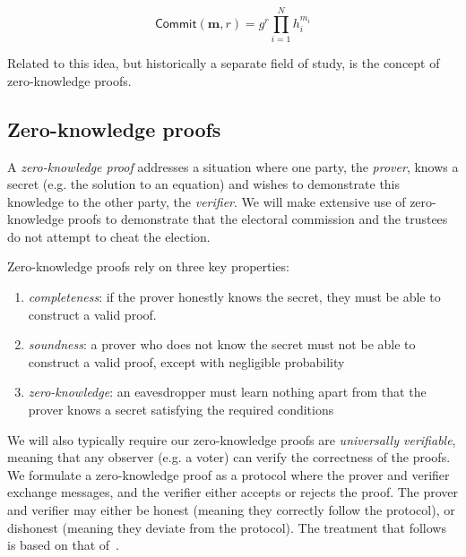\documentclass[12pt,a4paper]{article}
\theoremstyle{definition}
\begin{document}
$$\mathsf{Commit}(\mathbf{m}, r)=g^r\prod_{i=1}^N h_i^{m_i}$$

Related to this idea, but historically a separate field of study, is the concept of zero-knowledge proofs.

\subsection{Zero-knowledge proofs}
A \textit{zero-knowledge proof} addresses a situation where one party, the \textit{prover}, knows a secret (e.g. the solution to an equation) and wishes to demonstrate this knowledge to the other party, the \textit{verifier}. We will make extensive use of zero-knowledge proofs to demonstrate that the electoral commission and the trustees do not attempt to cheat the election.


Zero-knowledge proofs rely on three key properties:
\begin{enumerate}
    \item \textit{completeness}: if the prover honestly knows the secret, they must be able to construct a valid proof.
    \item \textit{soundness}: a prover who does not know the secret must not be able to construct a valid proof, except with negligible probability 
    \item \textit{zero-knowledge}: an eavesdropper must learn nothing apart from that the prover knows a secret satisfying the required conditions 
\end{enumerate}
We will also typically require our zero-knowledge proofs are \textit{universally verifiable}, meaning that any observer (e.g. a voter) can verify the correctness of the proofs. We formulate a zero-knowledge proof as a protocol where the prover and verifier exchange messages, and the verifier either accepts or rejects the proof. The prover and verifier may either be honest (meaning they correctly follow the protocol), or dishonest (meaning they deviate from the protocol). The treatment that follows is based on that of~\cite{boneh2020graduate}.
\end{document}
